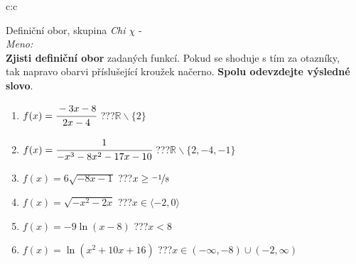 \documentclass[10pt]{report}
\begin{document}
\newpage
\thispagestyle{empty}
\begin{tabular}{c:c}
\begin{minipage}[c][99mm][t]{0.49\linewidth}
\begin{center}
\vspace{7mm}
{\huge Definiční obor, skupina \textit{Chi $\chi$} -}\\[4.5mm]
\textit{Meno:}\phantom{xxxxxxxxxxxxxxxxxxxxxxxxxxxxxxxxxxxxxxxxxxxxxxxxxxxxxxxxxxxxxxxxx}\\[3.5mm]
\textbf{Zjisti definiční obor} zadaných funkcí. Pokud se shoduje s tím za otazníky,\\tak napravo obarvi příslušející kroužek načerno. \textbf{Spolu odevzdejte výsledné slovo}.\\[3mm]
\begin{minipage}{0.77\linewidth}
\begin{center}
\begin{varwidth}{\textwidth}
\begin{enumerate}
\normalsize
\item $f(x)=\cfrac{-3x-8}{2x-4}$\quad \dotfill\; ???\;\dotfill \quad $\mathbb{R}\smallsetminus\{2\}$
\item $f(x)=\cfrac{1}{-x^3-8x^2-17x-10}$\quad \dotfill\; ???\;\dotfill \quad $\mathbb{R}\smallsetminus\{2,-4,-1\}$
\item $f(x)=6\sqrt{-8x-1}$\quad \dotfill\; ???\;\dotfill \quad $x\geq\nicefrac{-1}{8}$
\item $f(x)=\sqrt{-x^2-2x}$\quad \dotfill\; ???\;\dotfill \quad $x\in\langle-2 , 0\rangle$
\item $f(x)=-9\ln{(x-8)}$\quad \dotfill\; ???\;\dotfill \quad $x<8$
\item $f(x)=\ln{(x^2+10x+16)}$\quad \dotfill\; ???\;\dotfill \quad $x\in(-\infty , -8)\cup(-2 , \infty)$
\end{enumerate}
\end{varwidth}
\end{center}
\end{minipage}
\begin{minipage}{0.20\linewidth}

\end{minipage}
\end{center}
\end{minipage}
\end{tabular}
\end{document}
